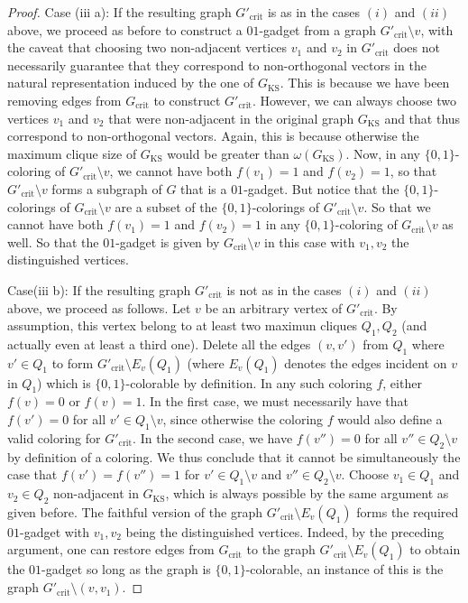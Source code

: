 \documentclass[twocolumn, a4paper, superscriptaddress,nofootinbib, accepted=2020-08-07, hyperref]{quantumarticle}
\begin{document}
\begin{proof}
Case (iii a): If the resulting graph $G'_{\text{crit}}$ is as in the cases $(i)$ and $(ii)$ above, we proceed as before to construct a $01$-gadget from a graph $G'_{\text{crit}}\setminus v$, with the caveat that choosing two non-adjacent vertices $v_1$ and $v_2$ in $G'_{\text{crit}}$ does not necessarily guarantee that they correspond to non-orthogonal vectors in the natural representation induced by the one of $G_\text{KS}$. This is because we have been removing edges from $G_\text{crit}$ to construct $G'_\text{crit}$. However, we can always choose two vertices $v_1$ and $v_2$ that were non-adjacent in the original graph $G_\text{KS}$ and that thus correspond to non-orthogonal vectors. Again, this is because otherwise the maximum clique size of $G_\text{KS}$ would be greater than $\omega(G_\text{KS})$. Now, in any $\{0,1\}$-coloring of $G'_{\text{crit}}\setminus v$, we cannot have both $f(v_1) = 1$ and $f(v_2) = 1$, so that $G'_{\text{crit}}\setminus v$ forms a subgraph of $G$ that is a $01$-gadget. But notice that the $\{0,1\}$-colorings of $G_{\text{crit}}\setminus v$ are a subset of the $\{0,1\}$-colorings of $G'_{\text{crit}}\setminus v$. So that we cannot have both $f(v_1) = 1$ and $f(v_2) = 1$ in any $\{0,1\}$-coloring of $G_{\text{crit}}\setminus v$ as well. So that the $01$-gadget is given by $G_{\text{crit}}\setminus v$ in this case with $v_1, v_2$ the distinguished vertices.




Case(iii b): If the resulting graph $G'_{\text{crit}}$ is not as in the cases $(i)$ and $(ii)$ above, we proceed as follows. 
Let $v$ be an arbitrary vertex of $G'_{\text{crit}}$. By assumption, this vertex belong to at least two maximun cliques $Q_1, Q_2$ (and actually even at least a third one). Delete all the edges $(v,v')$ from $Q_1$ where $v' \in Q_1$ to form $G'_{\text{crit}} \setminus E_v(Q_1)$ (where $E_v(Q_1)$ denotes the edges incident on $v$ in $Q_1$) which is $\{0,1\}$-colorable by definition. In any such coloring $f$, either $f(v)=0$ or $f(v)=1$. In the first case, we must necessarily have that $f(v')=0$ for all $v' \in Q_1\setminus v$, since otherwise the coloring $f$ would also define a valid coloring for $G'_{\text{crit}}$. In the second case, we have $f(v'')=0$ for all $v''\in Q_2\setminus v$ by definition of a coloring. We thus conclude that it cannot be simultaneously the case that $f(v')=f(v'')=1$ for $v'\in Q_1\setminus v$ and $v''\in Q_2\setminus v$. Choose $v_1 \in Q_1$ and $v_2\in Q_2$ non-adjacent in $G_\text{KS}$, which is always possible by the same argument as given before. The faithful version of the graph $G'_{\text{crit}} \setminus E_v(Q_1)$ forms the required $01$-gadget with $v_1, v_2$ being the distinguished vertices. Indeed, by the preceding argument, one can restore edges from $G_{\text{crit}}$ to the graph $G'_{\text{crit}} \setminus E_v(Q_1)$ to obtain the $01$-gadget so long as the graph is $\{0,1\}$-colorable, an instance of this is the graph $G'_{\text{crit}} \setminus (v, v_1)$. 



\end{proof}
\end{document}
